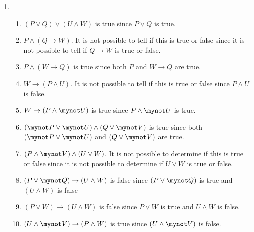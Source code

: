 \begin{enumerate}
\item \begin{enumerate}
  \item $(P \vee Q) \vee (U \wedge W)$ is true since $P \vee Q$ is true.
  \item $P \wedge (Q \to W)$.  It is not possible to tell if this is true or false since it is not possible to tell if $Q \to W$ is true or false.
  \item $P \wedge (W \to Q)$ is true since both $P$ and $W \to Q$ are true.
  \item $W \to (P \wedge U)$.  It is not possible to tell if this is true or false since $P \wedge U$ is false.
  \item $W \to (P \wedge \mynot U)$ is true since $P \wedge \mynot U$ is true.
  \item $(\mynot P \vee \mynot U) \wedge (Q \vee \mynot V)$ is true since both $(\mynot P \vee \mynot U)$ and 
$(Q \vee \mynot V)$ are true.
  \item $(P \wedge \mynot V) \wedge (U \vee W)$.  It is not possible to determine if this is true or false since it is not possible to determine if $U \vee W$ is true or false.
  \item $(P \vee \mynot Q) \to (U \wedge W)$ is false since $(P \vee \mynot Q)$ is true and $(U \wedge W)$ is false
  \item $(P \vee W) \to (U \wedge W)$ is false since $P \vee W$ is true and $U \wedge W$ is false.
  \item $(U \wedge \mynot V) \to (P \wedge W)$ is true since $(U \wedge \mynot V)$ is false.
\end{enumerate}


\end{enumerate}


\hbreak
\endinput
